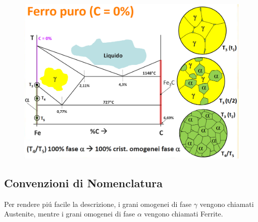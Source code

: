 \documentclass{article}
\begin{document}
{\begin{figure}[h!]
                    \includegraphics[width=.85\linewidth]{L12 - Diagramma Fe-C - Ferro Puro - Cambio di Struttura 2.png}
                \end{figure}
            \newpage
            \subsection{Convenzioni di Nomenclatura}
                Per rendere pi\'u facile la descrizione, i grani omogenei di fase $\gamma$ vengono chiamati Austenite, mentre i grani omogenei di fase $\alpha$ vengono chiamati Ferrite.
}
\end{document}
